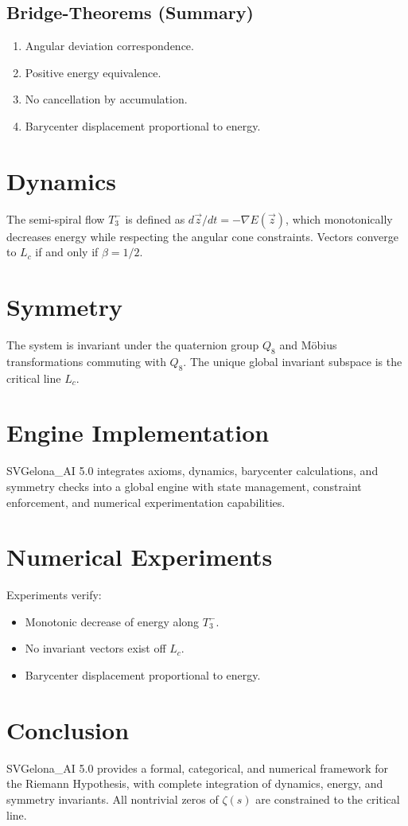 \documentclass[12pt]{article}
\begin{document}
\subsection{Bridge-Theorems (Summary)}
\begin{enumerate}
    \item Angular deviation correspondence.
    \item Positive energy equivalence.
    \item No cancellation by accumulation.
    \item Barycenter displacement proportional to energy.
\end{enumerate}

\section{Dynamics}
The semi-spiral flow $T_3^-$ is defined as $d\vec{z}/dt = -\nabla E(\vec{z})$, which monotonically decreases
energy while respecting the angular cone constraints. Vectors converge to $L_c$ if and only if $\beta=1/2$.

\section{Symmetry}
The system is invariant under the quaternion group $Q_8$ and Möbius transformations commuting with $Q_8$.
The unique global invariant subspace is the critical line $L_c$.

\section{Engine Implementation}
SVGelona\_AI 5.0 integrates axioms, dynamics, barycenter calculations, and symmetry checks into
a global engine with state management, constraint enforcement, and numerical experimentation capabilities.

\section{Numerical Experiments}
Experiments verify:
\begin{itemize}
    \item Monotonic decrease of energy along $T_3^-$.
    \item No invariant vectors exist off $L_c$.
    \item Barycenter displacement proportional to energy.
\end{itemize}

\section{Conclusion}
SVGelona\_AI 5.0 provides a formal, categorical, and numerical framework for the Riemann Hypothesis,
with complete integration of dynamics, energy, and symmetry invariants. All nontrivial zeros
of $\zeta(s)$ are constrained to the critical line.
\end{document}
